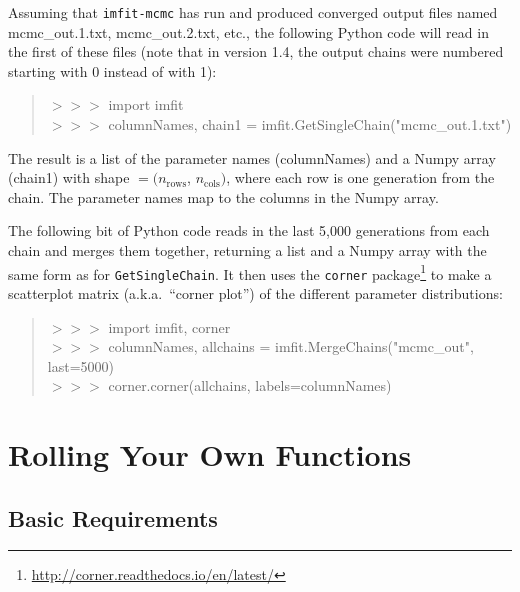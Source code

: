 \documentclass[10pt,a4paper,article]{memoir}
\newcommand{\imfitmcmc}{\texttt{imfit-mcmc}}
\begin{document}
Assuming that \imfitmcmc{} has run and produced converged output files 
named mcmc\_out.1.txt, mcmc\_out.2.txt, etc., the following Python code will read in the
first of these files (note that in version 1.4, the output chains were numbered
starting with 0 instead of with 1):
\begin{quote}
$>>>$ import imfit \\
$>>>$ columnNames, chain1 = imfit.GetSingleChain("mcmc\_out.1.txt")
\end{quote}

The result is a list of the parameter names (columnNames) and a Numpy
array (chain1) with shape $= (n_{\textrm{rows}}$, $n_{\textrm{cols}})$,
where each row is one generation from the chain. The parameter names
map to the columns in the Numpy array.

The following bit of Python code reads in the last 5,000 generations
from each chain and merges them together, returning a list and a Numpy
array with the same form as for \texttt{GetSingleChain}. It then uses
the \texttt{corner}
package\footnote{\url{http://corner.readthedocs.io/en/latest/}}
\citep{corner} to make a scatterplot matrix (a.k.a.\ ``corner plot'') of the
different parameter distributions:

\begin{quote}
$>>>$ import imfit, corner \\
$>>>$ columnNames, allchains = imfit.MergeChains("mcmc\_out", last=5000) \\
$>>>$ corner.corner(allchains, labels=columnNames)
\end{quote}






\newpage

\chapter{Rolling Your Own Functions}

\section{Basic Requirements}
\end{document}
